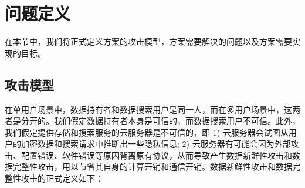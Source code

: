 

\section{问题定义}
在本节中，我们将正式定义方案的攻击模型，方案需要解决的问题以及方案需要实现的目标。

\subsection{攻击模型}
在单用户场景中，数据持有者和数据搜索用户是同一人，而在多用户场景中，这两者是分开的。我们假定数据持有者本身是可信的，而数据搜索用户不可信。此外，我们假定提供存储和搜索服务的云服务器是不可信的，即 1) 云服务器会试图从用户的加密数据和搜索请求中推断出一些隐私信息; 2) 云服务器有可能会因为外部攻击、配置错误、软件错误等原因背离原有协议，从而导致产生数据新鲜性攻击和数据完整性攻击，用以节省其自身的计算开销和通信开销。数据新鲜性攻击和数据完整性攻击的正式定义如下：

